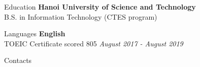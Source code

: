 \documentclass{resume}
\begin{document}
  \begin{rSection}{Education}
    {\bf Hanoi University of Science and Technology} \\ 
    { B.S. in Information Technology (CTES program) } \\
  \end{rSection}

  \begin{rSection}{Languages}
    {\bf English} \\ 
    { TOEIC Certificate scored 805  } \hfill {\em August 2017 - August 2019} \\
  \end{rSection}

  \newpage
  \begin{rSection}{Contacts}
  \end{rSection}
\end{document}
